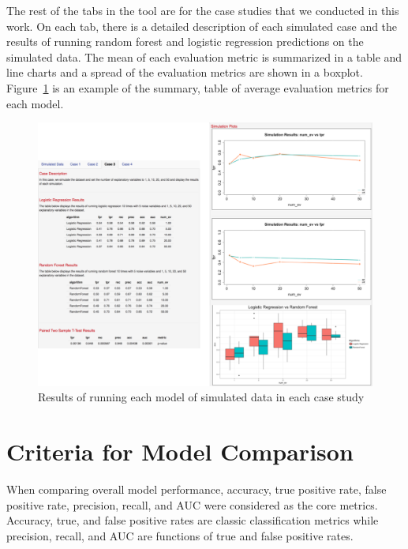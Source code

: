 \documentclass{llncs}
\begin{document}
The rest of the tabs in the tool are for the case studies that we conducted in this work. On each tab, there is a detailed description of each simulated case and the results of running random forest and logistic regression predictions on the simulated data.  The mean of each evaluation metric is summarized in a table and line charts and a spread of the evaluation metrics are shown in a boxplot. Figure~\ref{fig:center} is an example of the summary, table of average evaluation metrics for each model.

\begin{figure}
\centering
\includegraphics[scale=0.50]{results_long_3.png}
\caption{Results of running each model of simulated data in each case study}
\label{fig:center}
\end{figure}


\section{Criteria for Model Comparison}
When comparing overall model performance, accuracy, true positive rate, false positive rate, precision, recall, and AUC were considered as the core metrics. Accuracy, true, and false positive rates are classic classification metrics while precision, recall, and AUC are functions of true and false positive rates.
\end{document}
